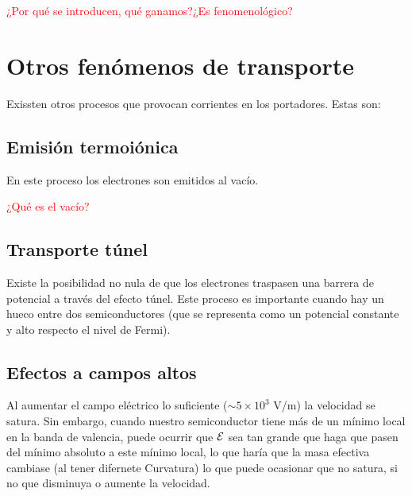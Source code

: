 \begin{Anotacion}
	\textcolor{red}{¿Por qué se introducen, qué ganamos?¿Es fenomenológico?}
\end{Anotacion}





\section{Otros fenómenos de transporte}

Exissten otros procesos que provocan corrientes en los portadores. Estas son:

\subsection{Emisión termoiónica}

En este proceso los electrones son emitidos al vacío.

\begin{Anotacion}
	\textcolor{red}{¿Qué es el vacío?}
\end{Anotacion}

\subsection{Transporte túnel}

Existe la posibilidad no nula de que los electrones traspasen una barrera de potencial a través del efecto túnel. Este proceso es importante cuando hay un hueco entre dos semiconductores (que se representa como un potencial constante y alto respecto el nivel de Fermi). 


\subsection{Efectos a campos altos}

Al aumentar el campo eléctrico lo suficiente ($\sim 5 \times 10^3$ V/m) la velocidad se satura. Sin embargo, cuando nuestro semiconductor tiene más de un mínimo local en la banda de valencia, puede ocurrir que $\mathcal{E}$ sea tan grande que haga que pasen del mínimo absoluto a este mínimo local, lo que haría que la masa efectiva cambiase (al tener difernete Curvatura) lo que puede ocasionar que no satura, si no que disminuya o aumente la velocidad.



